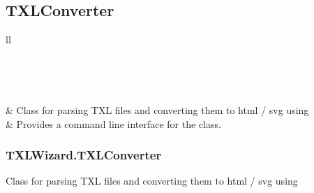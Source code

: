 \documentclass[letterpaper,10pt,english]{sphinxmanual}
\begin{document}
\subsection{TXLConverter}
\label{Chapters/40_PythonModuleReference:txlconverter}
\begin{longtable}{ll}
\hline
\endfirsthead

%
{{}} \\
\hline
\endhead

\hline {} \\ \hline
\endfoot

\endlastfoot


{\hyperref[Chapters/PythonModuleReference/TXLConverter/TXLWizard.TXLConverter:module\string-TXLWizard.TXLConverter]{}}
 & 
Class for parsing TXL files and converting them to html / svg using {\hyperref[Chapters/PythonModuleReference/TXLWriter/TXLWizard.TXLWriter:module\string-TXLWizard.TXLWriter]{}}
\\
\hline
{\hyperref[Chapters/PythonModuleReference/TXLConverter/TXLWizard.TXLConverterCLI:module\string-TXLWizard.TXLConverterCLI]{}}
 & 
Provides a command line interface for the {\hyperref[Chapters/PythonModuleReference/TXLConverter/TXLWizard.TXLConverter:TXLWizard.TXLConverter.TXLConverter]{}} class.
\\
\hline\end{longtable}



\subsubsection{TXLWizard.TXLConverter}
\label{Chapters/PythonModuleReference/TXLConverter/TXLWizard.TXLConverter:txlwizard-txlconverter}\label{Chapters/PythonModuleReference/TXLConverter/TXLWizard.TXLConverter::doc}\label{Chapters/PythonModuleReference/TXLConverter/TXLWizard.TXLConverter:module-TXLWizard.TXLConverter}
Class for parsing TXL files and converting them to html / svg using {\hyperref[Chapters/PythonModuleReference/TXLWriter/TXLWizard.TXLWriter:module\string-TXLWizard.TXLWriter]{}}
\end{document}
